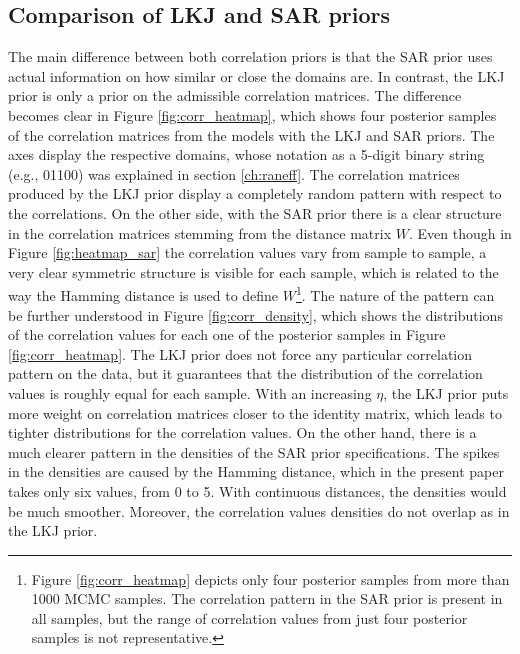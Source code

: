 \subsection{Comparison of LKJ and SAR priors}
\label{ch:comparison_lkj_sar}
The main difference between both correlation priors is that the SAR prior uses actual information on how similar or close the domains are.
In contrast, the LKJ prior is only a prior on the admissible correlation matrices.
The difference becomes clear in Figure \ref{fig:corr_heatmap}, which shows four posterior samples of the correlation matrices from the models with the LKJ and SAR priors.
The axes display the respective domains, whose notation as a 5-digit binary string (e.g., 01100) was explained in section \ref{ch:raneff}.
The correlation matrices produced by the LKJ prior display a completely random pattern with respect to the correlations.
On the other side, with the SAR prior there is a clear structure in the correlation matrices stemming from the distance matrix $W$.
Even though in Figure \ref{fig:heatmap_sar} the correlation values vary from sample to sample, a very clear symmetric structure is visible for each sample, which is related to the way the Hamming distance is used to define $W$\footnote{Figure \ref{fig:corr_heatmap} depicts only four posterior samples from more than 1000 MCMC samples. The correlation pattern in the SAR prior is present in all samples, but the range of correlation values from just four posterior samples is not representative.}.
The nature of the pattern can be further understood in Figure \ref{fig:corr_density}, which shows the distributions of the correlation values for each one of the posterior samples in Figure \ref{fig:corr_heatmap}.
The LKJ prior does not force any particular correlation pattern on the data, but it guarantees that the distribution of the correlation values is roughly equal for each sample.
With an increasing $\eta$, the LKJ prior puts more weight on correlation matrices closer to the identity matrix, which leads to tighter distributions for the correlation values.
On the other hand, there is a much clearer pattern in the densities of the SAR prior specifications.
The spikes in the densities are caused by the Hamming distance, which in the present paper takes only six values, from 0 to 5.
With continuous distances, the densities would be much smoother.
Moreover, the correlation values densities do not overlap as in the LKJ prior.


